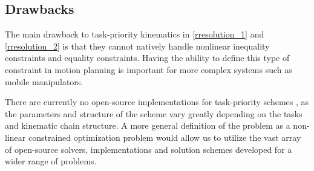 \documentclass[times, utf8, diplomski, english]{fer}
\begin{document}
\subsection{Drawbacks}\label{subsec:tp drawbacks}
The main drawback to task-priority kinematics in \eqref{rresolution_1} and \eqref{rresolution_2} is that they cannot natively handle nonlinear inequality constraints \citep{moe2016set} and equality constraints. 
Having the ability to define this type of constraint in motion planning is important for more complex systems such as mobile manipulators.

There are currently no open-source implementations for task-priority schemes , as the parameters and structure of the 
scheme vary greatly depending on the tasks and kinematic chain structure.
A more general definition of the problem as a non-linear constrained optimization problem would allow us to utilize the vast array of open-source solvers, implementations and solution schemes developed for a wider range of problems.
\end{document}
